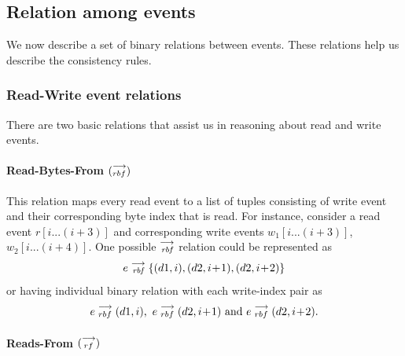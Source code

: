     \subsection{Relation among events}
        We now describe a set of binary relations between events. These relations help us describe the consistency rules.
        
        \subsubsection{Read-Write event relations}
        There are two basic relations that assist us in reasoning about read and write events.
        
            \paragraph{Read-Bytes-From $(\stackrel{\longrightarrow}{_{rbf}})$}
            
            This relation maps every read event to a list of tuples consisting of write event and their corresponding byte index that is read. For instance, consider a read event $r[i...(i+3)]$ and corresponding write events $w_1[i...(i+3)]$, $w_2[i...(i+4)]$. One possible $\stackrel{\longrightarrow}{_\textit{rbf}}$ relation could be represented as  
                \begin{align*}
                    e\stackrel{\longrightarrow}{_{\textit{rbf}}}\{(d1, i), (d2, i\!+\!1), (d2, i\!+\!2)\}     
                \end{align*}   
            or having individual binary relation with each write-index pair as 
            \begin{align*}
                e\stackrel{\longrightarrow}{_{rbf}}(d1, i),\ e\stackrel{\longrightarrow}{_{rbf}}(d2, i\!+\!1)  \text{ and } e\stackrel{\longrightarrow}{_{rbf}}(d2, i\!+\!2).
            \end{align*}
            
            \paragraph{Reads-From $(\stackrel{\longrightarrow}{_{rf}})$}
            
